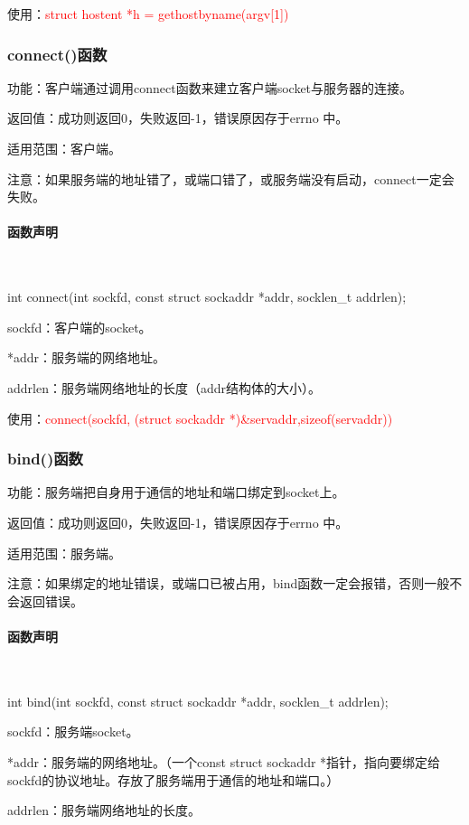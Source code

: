 \documentclass[UTF8]{article}%
\begin{document}
使用：\textcolor{red}{struct hostent *h = gethostbyname(argv[1])}

\subsubsection{connect()函数}

功能：客户端通过调用connect函数来建立客户端socket与服务器的连接。

返回值：成功则返回0，失败返回-1，错误原因存于errno 中。

适用范围：客户端。

注意：如果服务端的地址错了，或端口错了，或服务端没有启动，connect一定会失败。

\paragraph{函数声明}~{}

int connect(int sockfd, const struct sockaddr *addr, socklen\_t addrlen);

sockfd：客户端的socket。

*addr：服务端的网络地址。

addrlen：服务端网络地址的长度（addr结构体的大小）。

使用：\textcolor{red}{connect(sockfd, (struct sockaddr *)\&servaddr,sizeof(servaddr))}

\subsubsection{bind()函数}

功能：服务端把自身用于通信的地址和端口绑定到socket上。

返回值：成功则返回0，失败返回-1，错误原因存于errno 中。

适用范围：服务端。

注意：如果绑定的地址错误，或端口已被占用，bind函数一定会报错，否则一般不会返回错误。

\paragraph{函数声明}~{}

int bind(int sockfd, const struct sockaddr *addr, socklen\_t addrlen);

sockfd：服务端socket。

*addr：服务端的网络地址。（一个const struct sockaddr *指针，指向要绑定给sockfd的协议地址。存放了服务端用于通信的地址和端口。）

addrlen：服务端网络地址的长度。
\end{document}
